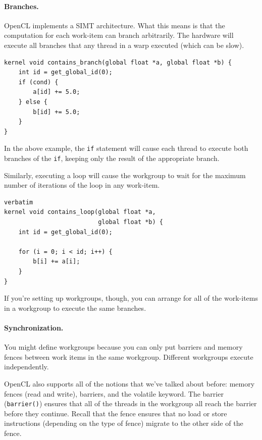 \documentclass[a4paper]{report}
\begin{document}
\paragraph{Branches.} OpenCL implements a SIMT architecture.
What this means is that the computation for each work-item can branch
arbitrarily. The hardware will execute all branches that any thread in
a warp executed (which can be slow). 

{\scriptsize \hspace*{2em} \begin{minipage}{.5\textwidth}
    \begin{lstlisting}
kernel void contains_branch(global float *a, global float *b) {
    int id = get_global_id(0);
    if (cond) {
        a[id] += 5.0;
    } else {
        b[id] += 5.0;
    }
}
    \end{lstlisting}
      \end{minipage}}

In the above example, the {\tt if} statement will cause
each thread to execute both branches of the {\tt if}, keeping only the
result of the appropriate branch.

Similarly, executing a loop will cause the
workgroup to wait for the maximum number of iterations of the loop in
any work-item.

{\scriptsize \hspace*{2em} \begin{minipage}{.5\textwidth}
    \begin{lstlisting}verbatim
kernel void contains_loop(global float *a, 
                          global float *b) {
    int id = get_global_id(0);
    
    for (i = 0; i < id; i++) {
        b[i] += a[i];
    }
}
    \end{lstlisting}
\end{minipage} }

If you're setting up workgroups, though, you can arrange for all
of the work-items in a workgroup to execute the same branches.

\paragraph{Synchronization.} You might define
workgroups because you can only put barriers and memory fences between
work items in the same workgroup. Different workgroups execute
independently.

OpenCL also supports all of the notions that we've talked about
before: memory fences (read and write), barriers, and the volatile
keyword.  The barrier ({\tt barrier()}) ensures that all of the
threads in the workgroup all reach the barrier before they continue.
Recall that the fence ensures that no load or store instructions
(depending on the type of fence) migrate to the other side of the fence.
\end{document}
